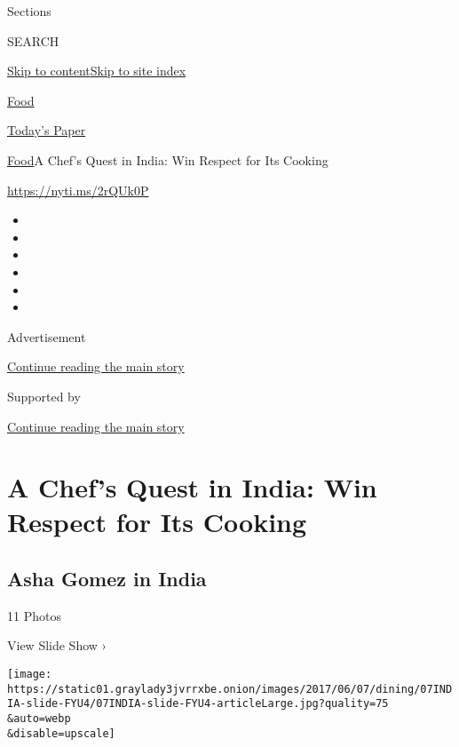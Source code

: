 Sections

SEARCH

\protect\hyperlink{site-content}{Skip to
content}\protect\hyperlink{site-index}{Skip to site index}

\href{https://www.nytimes3xbfgragh.onion/section/food}{Food}

\href{https://myaccount.nytimes3xbfgragh.onion/auth/login?response_type=cookie\&client_id=vi}{}

\href{https://www.nytimes3xbfgragh.onion/section/todayspaper}{Today's
Paper}

\href{/section/food}{Food}\textbar{}A Chef's Quest in India: Win Respect
for Its Cooking

\url{https://nyti.ms/2rQUk0P}

\begin{itemize}
\item
\item
\item
\item
\item
\item
\end{itemize}

Advertisement

\protect\hyperlink{after-top}{Continue reading the main story}

Supported by

\protect\hyperlink{after-sponsor}{Continue reading the main story}

\hypertarget{a-chefs-quest-in-india-win-respect-for-its-cooking}{%
\section{A Chef's Quest in India: Win Respect for Its
Cooking}\label{a-chefs-quest-in-india-win-respect-for-its-cooking}}

\href{https://www.nytimes3xbfgragh.onion/slideshow/2017/06/06/dining/asha-gomez-in-india.html}{}

\hypertarget{asha-gomez-in-india}{%
\subsection{Asha Gomez in India}\label{asha-gomez-in-india}}

11 Photos

View Slide Show ›

\texttt{[image: https://static01.graylady3jvrrxbe.onion/images/2017/06/07/dining/07INDIA-slide-FYU4/07INDIA-slide-FYU4-articleLarge.jpg?quality=75\\\&auto=webp\\\&disable=upscale]}

